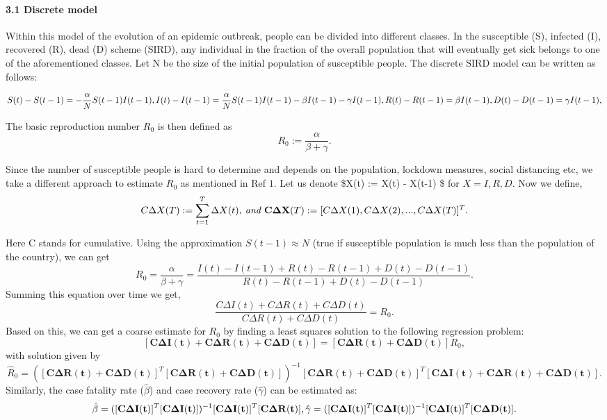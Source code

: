 \documentclass[]{article}
\let\oldparagraph\paragraph
\renewcommand{\paragraph}[1]{\oldparagraph{#1}\mbox{}}
\begin{document}
\hypertarget{discrete-model}{%
\paragraph{3.1 Discrete model}\label{discrete-model}}

Within this model of the evolution of an epidemic outbreak, people can
be divided into different classes. In the susceptible (S), infected (I),
recovered (R), dead (D) scheme (SIRD), any individual in the fraction of
the overall population that will eventually get sick belongs to one of
the aforementioned classes. Let N be the size of the initial population
of susceptible people. The discrete SIRD model can be written as
follows:

\[
S(t) - S(t-1) = -\frac{\alpha}{N} S(t-1)I(t-1), \\
I(t) - I(t-1) = \frac{\alpha}{N} S(t-1)I(t-1) - \beta I(t-1) - \gamma I(t-1), \\
R(t) - R(t-1) = \beta I(t-1), \\
D(t) - D(t-1) = \gamma I(t-1) ,
\]

The basic reproduction number \(R_{0}\) is then defined as \[
R_{0} := \frac{\alpha}{\beta + \gamma}. 
\]

Since the number of susceptible people is hard to determine and depends
on the population, lockdown measures, social distancing etc, we take a
different approach to estimate \(R_{0}\) as mentioned in Ref \(1\). Let
us denote \$\Delta X(t) := X(t) - X(t-1) \$ for \(X=I, R, D\). Now we
define, \[
C\Delta X(T) := \sum_{t=1}^{T} \Delta X(t) \textit{,     and  }\\ 
\mathbf{C \Delta X} (T) := [C\Delta X(1), C\Delta X(2), ..., C\Delta X(T)]^{T} . 
\]

Here C stands for cumulative. Using the approximation
\(S(t-1) \approx N\) (true if susceptible population is much less than
the population of the country), we can get \[ 
R_{0} = \frac{\alpha}{\beta + \gamma} = \frac{I(t) - I(t-1) + R(t) - R(t-1) + D(t) - D(t-1)}{R(t) - R(t-1) + D(t) - D(t-1)}.
\] Summing this equation over time we get, \[
\frac{C\Delta I(t) +C\Delta R(t) + C\Delta D(t) }{C\Delta R(t) + C \Delta D(t)} = R_{0}.
\] Based on this, we can get a coarse estimate for \(R_{0}\) by finding
a least squares solution to the following regression problem:\\
\[
[\mathbf{C\Delta I(t) +C\Delta R(t) + C\Delta D(t)}] = [\mathbf{C\Delta R(t) + C \Delta D(t)}] R_{0}, 
\] with solution given by \[
\hat{R}_{0} = ([\mathbf{C\Delta R(t) + C \Delta D(t)}]^{T}[\mathbf{C\Delta R(t) + C \Delta D(t)}])^{-1} [\mathbf{C\Delta R(t) + C \Delta D(t)}]^{T}  [\mathbf{C\Delta I(t) +C\Delta R(t) + C\Delta D(t)}].
\] Similarly, the case fatality rate (\(\hat{\beta}\)) and case recovery
rate (\(\hat{\gamma}\)) can be estimated as: \[
 \hat{\beta} = ([\mathbf{C\Delta I(t) }]^{T}[\mathbf{C\Delta I(t) }])^{-1} [\mathbf{C\Delta I(t)}]^{T}  [\mathbf{C\Delta R(t) }], \\
 \hat{\gamma} = ([\mathbf{C\Delta I(t) }]^{T}[\mathbf{C\Delta I(t)}])^{-1} [\mathbf{C\Delta I(t) }]^{T}  [\mathbf{ C\Delta D(t)}].
 \]
\end{document}
